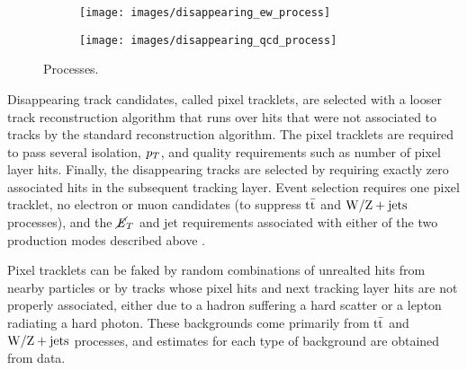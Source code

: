 \documentclass[12pt]{article}
\begin{document}
        \noindent \begin{figure}[htbp] \begin{center}
        \begin{subfigure}[htbp]{0.2\textwidth} \begin{center}
        \texttt{[image: images/disappearing\_ew\_process]}
        \end{center} \end{subfigure}
        \qquad
        \begin{subfigure}[htbp]{0.2\textwidth} \begin{center}
        \texttt{[image: images/disappearing\_qcd\_process]}
        \end{center} \end{subfigure}
            \caption{Processes.~\cite{atlas_disappearing}}
        \label{disappearing_processes}
        \end{center} \end{figure}

        Disappearing track candidates, called pixel tracklets, are selected with a looser track reconstruction algorithm that runs over hits that were not associated to tracks by the standard reconstruction algorithm. The pixel tracklets are required to pass several isolation, $p_T$, and quality requirements such as number of pixel layer hits. Finally, the disappearing tracks are selected by requiring exactly zero associated hits in the subsequent tracking layer. Event selection requires one pixel tracklet, no electron or muon candidates (to suppress $\mathrm{t}\bar{\mathrm{t}}$ and $\mathrm{W}/\mathrm{Z} + \mathrm{jets}$ processes), and the $\cancel{\it{E}}_{T}$ and jet requirements associated with either of the two production modes described above .
        
        Pixel tracklets can be faked by random combinations of unrealted hits from nearby particles or by tracks whose pixel hits and next tracking layer hits are not properly associated, either due to a hadron suffering a hard scatter or a lepton radiating a hard photon. These backgrounds come primarily from $\mathrm{t}\bar{\mathrm{t}}$ and $\mathrm{W}/\mathrm{Z} + \mathrm{jets}$ processes, and estimates for each type of background are obtained from data. 
\end{document}
